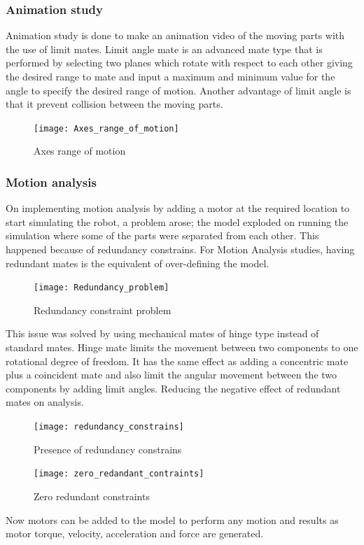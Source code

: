 \bigskip
\subsubsection{Animation study} 
Animation study is done to make an animation video of the moving parts with the use of limit mates. Limit angle mate is an advanced mate type that is performed by selecting two planes which rotate with respect to each other giving the desired range to mate and input a maximum and minimum value for the angle to specify the desired range of motion. Another advantage of limit angle is that it prevent collision between the moving parts.

\begin{figure}[H]
	\centering
	\texttt{[image: Axes\_range\_of\_motion]}
	\caption{Axes range of motion}
\end{figure}

\bigskip
\subsubsection{Motion analysis}
On implementing motion analysis by adding a motor at the required location to start simulating the robot, a problem arose; the model exploded on running the simulation where some of the parts were separated from each other. This happened because of redundancy constrains. For Motion Analysis studies, having redundant mates is the equivalent of over-defining the model.  

\begin{figure}[H]
	\centering
	\texttt{[image: Redundancy\_problem]}
	\caption{Redundancy constraint problem}
\end{figure}

This issue was solved by using mechanical mates of hinge type instead of standard mates. Hinge mate limits the movement between two components to one rotational degree of freedom. It has the same effect as adding a concentric mate plus a coincident mate and also limit the angular movement between the two components by adding limit angles. Reducing the negative effect of redundant mates on analysis.

\begin{figure}[H]
	\centering
	\texttt{[image: redundancy\_constrains]}
	\caption{Presence of redundancy constrains}
\end{figure}

\begin{figure}[H]
	\centering
	\texttt{[image: zero\_redandant\_contraints]}
	\caption{Zero redundant constraints}
\end{figure}
\smallskip
Now motors can be added to the model to perform any motion and results as motor torque, velocity, acceleration and force are generated.

